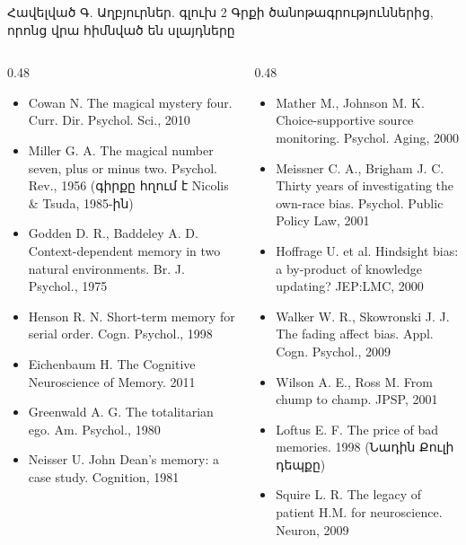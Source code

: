 \begin{frame}{Հավելված Գ. Աղբյուրներ. գլուխ 2}
  \scriptsize
  Գրքի ծանոթագրություններից, որոնց վրա հիմնված են սլայդները\par\smallskip
  \begin{columns}[T]
    \begin{column}{0.48\textwidth}
      \begin{itemize}\setlength{\itemsep}{0.4mm}
        \item Cowan N. The magical mystery four. Curr. Dir. Psychol. Sci., 2010
        \item Miller G. A. The magical number seven, plus or minus two. Psychol. Rev., 1956 (գիրքը հղում է Nicolis \& Tsuda, 1985-ին)
        \item Godden D. R., Baddeley A. D. Context-dependent memory in two natural environments. Br. J. Psychol., 1975
        \item Henson R. N. Short-term memory for serial order. Cogn. Psychol., 1998
        \item Eichenbaum H. The Cognitive Neuroscience of Memory. 2011
        \item Greenwald A. G. The totalitarian ego. Am. Psychol., 1980
        \item Neisser U. John Dean's memory: a case study. Cognition, 1981
      \end{itemize}
    \end{column}
    \begin{column}{0.48\textwidth}
      \begin{itemize}\setlength{\itemsep}{0.4mm}
        \item Mather M., Johnson M. K. Choice-supportive source monitoring. Psychol. Aging, 2000
        \item Meissner C. A., Brigham J. C. Thirty years of investigating the own-race bias. Psychol. Public Policy Law, 2001
        \item Hoffrage U. et al. Hindsight bias: a by-product of knowledge updating? JEP:LMC, 2000
        \item Walker W. R., Skowronski J. J. The fading affect bias. Appl. Cogn. Psychol., 2009
        \item Wilson A. E., Ross M. From chump to champ. JPSP, 2001
        \item Loftus E. F. The price of bad memories. 1998 (Նադին Քուլի դեպքը)
        \item Squire L. R. The legacy of patient H.M. for neuroscience. Neuron, 2009
      \end{itemize}
    \end{column}
  \end{columns}
\end{frame}

